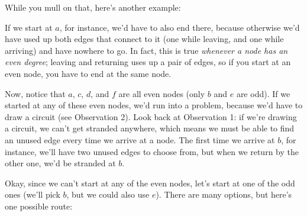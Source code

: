 While you mull on that, here's another example:
\begin{center}
\end{center}

If we start at $a$, for instance, we'd have to also end there, because otherwise we'd have used up both edges that connect to it (one while leaving, and one while arriving) and have nowhere to go.  In fact, this is true \emph{whenever a node has an even degree}; leaving and returning uses up a pair of edges, so if you start at an even node, you have to end at the same node.

Now, notice that $a$, $c$, $d$, and $f$ are all even nodes (only $b$ and $e$ are odd).  If we started at any of these even nodes, we'd run into a problem, because we'd have to draw a circuit (see Observation 2).  Look back at Observation 1: if we're drawing a circuit, we can't get stranded anywhere, which means we must be able to find an unused edge every time we arrive at a node.  The first time we arrive at $b$, for instance, we'll have two unused edges to choose from, but when we return by the other one, we'd be stranded at $b$.

Okay, since we can't start at any of the even nodes, let's start at one of the odd ones (we'll pick $b$, but we could also use $e$).  There are many options, but here's one possible route:
\begin{center}
\end{center}
\pagebreak

